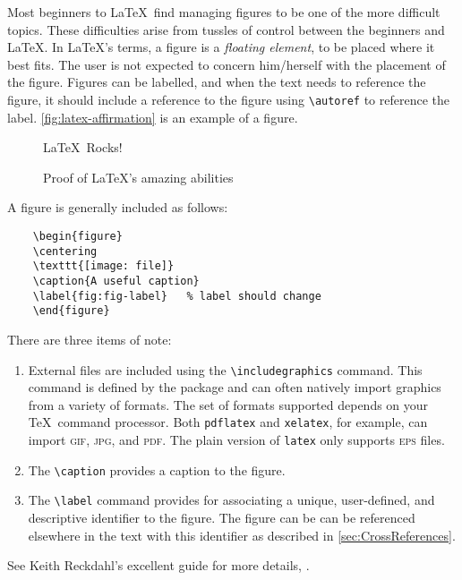 Most beginners to \LaTeX\ find managing figures to be one of the
more difficult topics.  These difficulties arise from tussles of
control between the beginners and \LaTeX.  In \LaTeX's terms, a figure
is a \emph{floating element}, to be placed where it best fits.
The user is not expected to concern him/herself with the placement
of the figure.  Figures can be labelled, and when the text needs
to reference the figure, it should include a reference to the figure
using \verb+\autoref+ to reference the label. 
\autoref{fig:latex-affirmation} is an example of a figure.
\begin{figure}
    \centering
    \Huge{\textsf{\LaTeX\ Rocks!}}
    \caption{Proof of \LaTeX's amazing abilities}
    \label{fig:latex-affirmation}   %
\end{figure}
A figure is generally included as follows:
\begin{lstlisting}
    \begin{figure}
    \centering
    \texttt{[image: file]}
    \caption{A useful caption}
    \label{fig:fig-label}   % label should change
    \end{figure}
\end{lstlisting}
There are three items of note:
\begin{enumerate}
\item External files are included using the \verb+\includegraphics+
    command.  This command is defined by the  package
    and can often natively import graphics from a variety of formats.
    The set of formats supported depends on your \TeX\ command processor.
    Both \texttt{pdflatex} and \texttt{xelatex}, for example, can
    import \textsc{gif}, \textsc{jpg}, and \textsc{pdf}.  The plain
    version of \texttt{latex} only supports \textsc{eps} files.

\item The \verb+\caption+ provides a caption to the figure.

\item The \verb+\label+ command provides for associating a unique, user-defined,
    and descriptive identifier to the figure.  The figure can be
    can be referenced elsewhere in the text with this identifier
    as described in \autoref{sec:CrossReferences}.
\end{enumerate}
See Keith Reckdahl’s excellent guide for more details,
.

